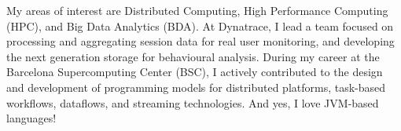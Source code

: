 %
%
%

\par{
My areas of interest are Distributed Computing, High Performance Computing (HPC), and Big Data Analytics (BDA). At Dynatrace, I lead a team focused on processing and aggregating session data for real user monitoring, and developing the next generation storage for behavioural analysis. During my career at the Barcelona Supercomputing Center (BSC), I actively contributed to the design and development of programming models for distributed platforms, task-based workflows, dataflows, and streaming technologies. And yes, I love JVM-based languages!
}

\vspace{1em}
